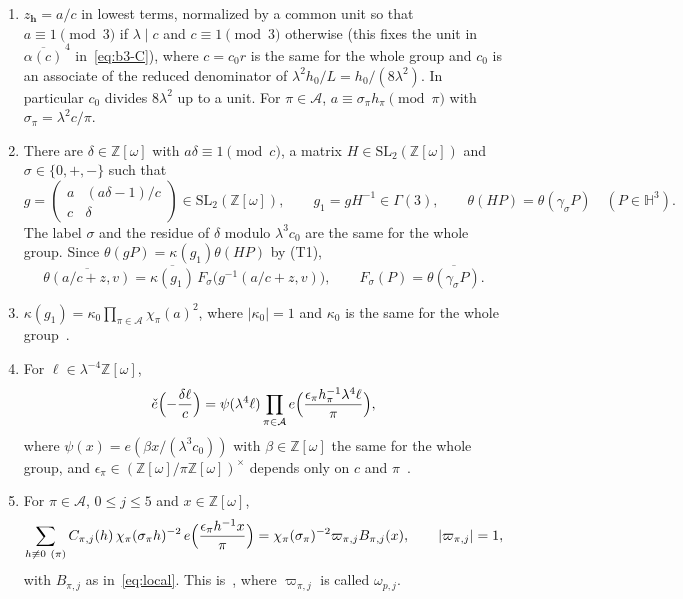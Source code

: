 \documentclass[11pt]{article}
\numberwithin{equation}{section}
\newcommand{\OO}{\mathbb Z[\omega]}
\newcommand{\ce}{\check e}
\begin{document}
\begin{enumerate}
\item[(a)] $z_{\mathbf h}=a/c$ in lowest terms, normalized by a common unit so that
 $a\equiv1\pmod3$ if $\lambda\mid c$ and $c\equiv1\pmod3$ otherwise (this fixes the unit in
 $\overline{\alpha(c)}^{\,4}$ in~\eqref{eq:b3-C}), where $c=c_0r$ is the same
 for the whole group and $c_0$ is an associate of the reduced denominator
 of $\lambda^2h_0/L=h_0/(8\lambda^2)$. In particular $c_0$ divides
 $8\lambda^2$ up to a unit. For $\pi\in\mathcal A$,
 $a\equiv\sigma_\pi h_\pi\pmod\pi$ with $\sigma_\pi=\lambda^2c/\pi$.
\item[(b)] There are $\delta\in\OO$ with $a\delta\equiv1\pmod c$, a matrix
 $H\in\mathrm{SL}_2(\OO)$ and $\sigma\in\{0,+,-\}$ such that
 \begin{equation}\label{eq:d105}
  g=\begin{pmatrix}a&(a\delta-1)/c\\c&\delta\end{pmatrix}
  \in\mathrm{SL}_2(\OO),\qquad
  g_1=gH^{-1}\in\Gamma(3),\qquad
  \theta(HP)=\theta(\gamma_\sigma P)\quad(P\in\mathbb H^3).
 \end{equation}
 The label $\sigma$ and the residue of $\delta$ modulo $\lambda^3c_0$ are
 the same for the whole group. Since $\theta(gP)=\kappa(g_1)\theta(HP)$
 by (T1),
 \begin{equation}\label{eq:b3-automorphy}
  \overline{\theta(a/c+z,v)}
  =\overline{\kappa(g_1)}\,F_\sigma\bigl(g^{-1}(a/c+z,v)\bigr),
  \qquad F_\sigma(P)=\overline{\theta(\gamma_\sigma P)}.
 \end{equation}
\item[(c)] $\kappa(g_1)=\kappa_0\prod_{\pi\in\mathcal A}\chi_\pi(a)^2$,
 where $|\kappa_0|=1$ and $\kappa_0$ is the same for the whole
 group~\cite[(A.10)]{OAI1112}.
\item[(d)] For $\ell\in\lambda^{-4}\OO$,
 \begin{equation}\label{eq:b3-crt}
  \ce\Bigl(-\frac{\delta\ell}c\Bigr)=\psi(\lambda^4\ell)
  \prod_{\pi\in\mathcal A}e\Bigl(\frac{\epsilon_\pi h_\pi^{-1}\lambda^4\ell}
  \pi\Bigr),
 \end{equation}
 where $\psi(x)=e(\beta x/(\lambda^3c_0))$ with $\beta\in\OO$ the same for
 the whole group, and $\epsilon_\pi\in(\OO/\pi\OO)^\times$ depends only
 on $c$ and $\pi$~\cite[(A.11)]{OAI1112}.
\item[(e)] For $\pi\in\mathcal A$, $0\le j\le5$ and $x\in\OO$,
 \begin{equation}\label{eq:b3-local}
  \sum_{h\not\equiv0\ (\pi)}C_{\pi,j}(h)\,\chi_\pi(\sigma_\pi h)^{-2}\,
  e\Bigl(\frac{\epsilon_\pi h^{-1}x}\pi\Bigr)
  =\chi_\pi(\sigma_\pi)^{-2}\varpi_{\pi,j}B_{\pi,j}(x),
  \qquad|\varpi_{\pi,j}|=1,
 \end{equation}
 with $B_{\pi,j}$ as in~\eqref{eq:local}. This
 is~\cite[(A.12)]{OAI1112}, where $\varpi_{\pi,j}$ is called
 $\omega_{p,j}$.
\end{enumerate}
\end{document}
